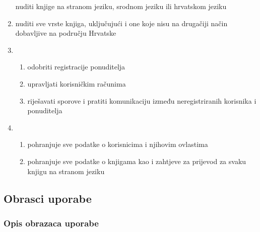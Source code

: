 \documentclass[12pt]{report}
\begin{document}
\begin{enumerate}
	nuditi knjige na stranom jeziku, srodnom jeziku ili hrvatskom jeziku
	
	
	\item {}
	
	nuditi sve vrste knjiga, uključujući i one koje nisu na drugačiji način dobavljive na području
	Hrvatske
	
	\item {}
	\begin{enumerate}
		\item odobriti registracije ponuditelja
		\item upravljati korisničkim računima
		\item riješavati sporove i pratiti komunikaciju između neregistriranih korisnika i ponuditelja
	\end{enumerate}
		
	\item {}
	
	\begin{enumerate}
		
		\item pohranjuje sve podatke o korisnicima i njihovim ovlastima
		
		\item pohranjuje sve podatke o knjigama kao i zahtjeve za prijevod za svaku knjigu na stranom jeziku
		
	\end{enumerate}
	
\end{enumerate}

\eject 



\subsection{Obrasci uporabe}

\subsubsection{Opis obrazaca uporabe}
\end{document}
